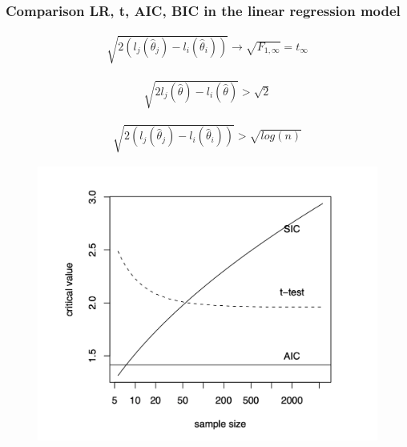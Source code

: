 \documentclass[
  shownotes,
  xcolor={svgnames},
  hyperref={colorlinks,citecolor=DarkBlue,linkcolor=DarkRed,urlcolor=DarkBlue}
  , aspectratio=169]{beamer}
\begin{document}
\begin{frame}[fragile]
\frametitle{Comparison LR, t, AIC, BIC in the linear regression model}


\begin{minipage}[t]{0.52\linewidth}
\scriptsize
\begin{align}
\sqrt{2(l_j(\hat \theta_j)-l_i(\hat \theta_i))} \rightarrow \sqrt{F_{1,\infty}}=t_\infty \nonumber
\end{align}

\begin{align}
\sqrt{2 l_j(\hat \theta) - l_i(\hat \theta)} > \sqrt{2} \nonumber
\end{align}

\begin{align}
 \sqrt{2(l_j(\hat \theta_j)-l_i(\hat \theta_i)) }> \sqrt{log(n)} \nonumber
 \end{align}
  \end{minipage}
    \hfill
    \begin{minipage}[t]{0.43\linewidth}%

\begin{figure}[H] \centering
            \captionsetup{justification=centering}
              \includegraphics[scale=0.3]{figures/Fig1}
 \end{figure}
   \end{minipage}

\end{frame}
\end{document}
